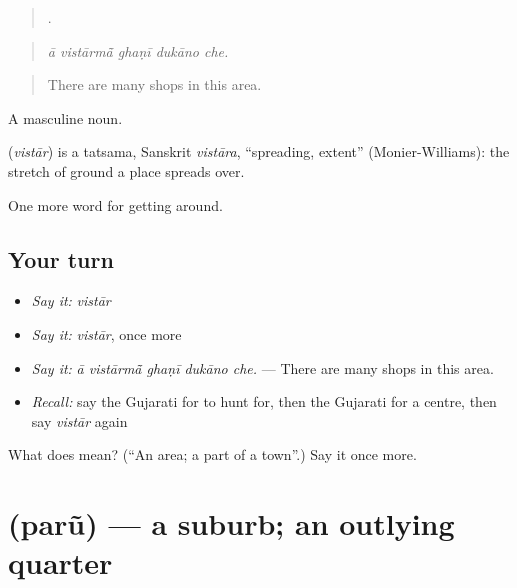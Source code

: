\begin{quote}
    .
\end{quote}

\begin{quote}
\emph{ā vistārmā̃ ghaṇī dukāno che.}
\end{quote}

\begin{quote}
There are many shops in this area.
\end{quote}

A masculine noun.

\begin{cousinweb}
\textbf{} (\emph{vistār}) is a tatsama, Sanskrit \emph{vistāra}, \textquotedblleft{}spreading, extent\textquotedblright{} (Monier-Williams): the stretch of ground a place spreads over.
\end{cousinweb}

\begin{grammarlens}[title={What you've built}]
One more word for getting around.
\end{grammarlens}

\subsection*{Your turn}
\begin{itemize}
\raggedright
  \item \emph{Say it:} \emph{vistār}
  \item \emph{Say it:} \emph{vistār}, once more
  \item \emph{Say it:} \emph{ā vistārmā̃ ghaṇī dukāno che.} — There are many shops in this area.
  \item \emph{Recall:} say the Gujarati for to hunt for, then the Gujarati for a centre, then say \emph{vistār} again
\end{itemize}

\begin{tcolorbox}[breakable,colback=teal!4,colframe=teal!35!black,title={Before you move on}]
What does  mean? (\textquotedblleft{}An area; a part of a town\textquotedblright{}.) Say it once more.
\end{tcolorbox}
\section[\texorpdfstring{\gu{પરું} (parũ)}{પરું (parũ)}]{ (parũ) — a suburb; an outlying quarter}

